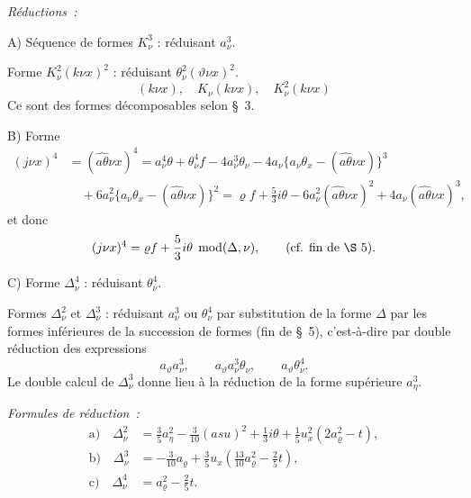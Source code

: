 \documentclass[11pt]{article}
\newcommand{\A}{\Delta}
\newcommand{\R}{\varrho}
\newcommand{\modu}[1]{\;\operatorname{mod} #1}
\providecommand{\modu}[1]{\;\operatorname{mod} #1}
\begin{document}
\noindent\emph{Réductions :}

\noindent A) Séquence de formes $K_\nu^3$ : réduisant $a_\nu^3$.

Forme $K_\nu^2(k\nu x)^2$ : réduisant $\theta_\nu^2(\vartheta\nu x)^2$.
\[
(k\nu x),\quad K_\nu(k\nu x),\quad K_\nu^2(k\nu x)
\]
Ce sont des formes décomposables selon \S\ 3.

\noindent B) Forme
\[
\begin{aligned}
(j\nu x)^4&=(\widehat{a\theta}\nu x)^4
=a_\nu^4\theta+\theta_\nu^4 f-4a_\nu^3\theta_\nu
-4a_\nu\{a_\nu\theta_x-(\widehat{a\theta}\nu x)\}^3\\
&\quad+6a_\nu^2\{a_\nu\theta_x-(\widehat{a\theta}\nu x)\}^2
=\R f+\frac53 i\theta-6a_\nu^2(\widehat{a\theta}\nu x)^2
+4a_\nu(\widehat{a\theta}\nu x)^3,
\end{aligned}
\]
et donc
\[
(j\nu x)^4=\R f+\frac53 i\theta\modu{(\A,\nu)},\qquad (\text{cf. fin de \S\ 5}).
\]

\noindent C) Forme $\A_\nu^4$ : réduisant $\theta_\nu^4$.

Formes $\A_\nu^2$ et $\A_\nu^3$ : réduisant $a_\nu^3$ ou $\theta_\nu^4$ par substitution de la forme $\A$ par les formes inférieures de la succession de formes (fin de \S\ 5), c'est-à-dire par double réduction des expressions
\[
a_\vartheta a_\nu^3,
\qquad a_\vartheta a_\nu^3\theta_\nu,
\qquad a_\vartheta\theta_\nu^4.
\]
Le double calcul de $\A_\nu^3$ donne lieu à la réduction de la forme supérieure $a_\eta^3$.

\noindent\emph{Formules de réduction :}
\[
\tag{10}
\begin{aligned}
\text{a)}\quad \A_\nu^2
&=\frac35a_\eta^2-\frac3{10}(asu)^2+\frac13 i\theta
+\frac15u_x^2(2a_\R^2-t),\\
\text{b)}\quad \A_\nu^3
&=-\frac3{10}a_\R+\frac35u_x\left(\frac{13}{10}a_\R^2-\frac25t\right),\\
\text{c)}\quad \A_\nu^4&=a_\R^2-\frac25t.
\end{aligned}
\]
\end{document}
